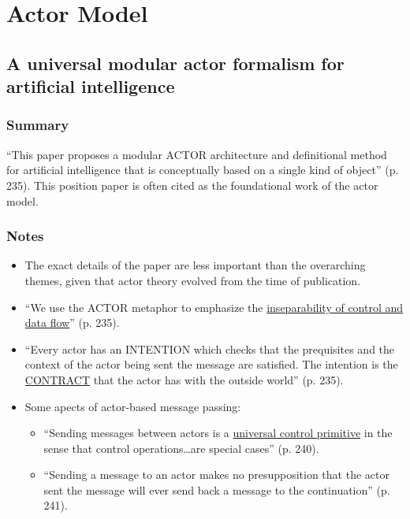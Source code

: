 \section{Actor Model}

\subsection{A universal modular actor formalism for artificial intelligence}


\subsubsection*{Summary}
``This paper proposes a modular ACTOR architecture and definitional method for artificial intelligence that is conceptually based on a single kind of object'' (p. 235). This position paper is often cited as the foundational work of the actor model.

\subsubsection*{Notes}

\begin{itemize}
  \item The exact details of the paper are less important than the overarching themes, given that actor theory evolved from the time of publication.
  \item ``We use the ACTOR metaphor to emphasize the \underline{inseparability of control and data flow}'' (p. 235).
  \item ``Every actor has an INTENTION which checks that the prequisites and the context of the actor being sent the message are satisfied. The intention is the \underline{CONTRACT} that the actor has with the outside world'' (p. 235).
  \item Some apects of actor-based message passing:
    \begin{itemize}
      \item ``Sending messages between actors is a \underline{universal control primitive} in the sense that control operations{\ldots}are special cases'' (p. 240).
      \item ``Sending a message to an actor makes no presupposition that the actor sent the message will ever send back a message to the continuation'' (p. 241).
    \end{itemize}
\end{itemize}

